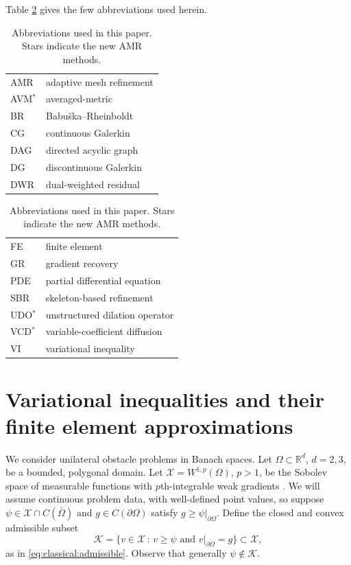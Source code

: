 \documentclass[]{interact}
\theoremstyle{plain}%
\theoremstyle{definition}
\theoremstyle{remark}
\newcommand{\RR}{\mathbb{R}}
\newcommand{\cK}{\mathcal{K}}
\newcommand{\cX}{\mathcal{X}}
\begin{document}
Table \ref{tab:abbrev} gives the few abbreviations used herein.

\begin{table}[ht]
\centering
\begin{minipage}[t]{0.45\textwidth}
\vspace{0pt}
{\small
\begin{tabular}{ll} \\
AMR       & adaptive mesh refinement \\
AVM$^*$   & averaged-metric \\
BR        & Babu\v{s}ka--Rheinboldt \\
CG        & continuous Galerkin \\
DAG       & directed acyclic graph \\
DG        & discontinuous Galerkin \\
DWR       & dual-weighted residual
\end{tabular}
}
\end{minipage}
\quad
\begin{minipage}[t]{0.45\textwidth}
\vspace{0pt}
{\small
\begin{tabular}{ll} \\
FE        & finite element \\
GR        & gradient recovery \\
PDE       & partial differential equation \\
SBR       & skeleton-based refinement \\
UDO$^*$   & unstructured dilation operator \\
VCD$^*$   & variable-coefficient diffusion \\
VI        & variational inequality
\end{tabular}
}
\end{minipage}
\caption{Abbreviations used in this paper.  Stars indicate the new AMR methods.}
\label{tab:abbrev}
\end{table}


\section{Variational inequalities and their finite element approximations} \label{sec:vifem}

We consider unilateral obstacle problems in Banach spaces.  Let $\Omega \subset \RR^d$, $d=2,3$, be a bounded, polygonal domain.  Let $\cX = W^{1,p}(\Omega)$, $p>1$, be the Sobolev space of measurable functions with $p$th-integrable weak gradients \cite{Evans2010}.  We will assume continuous problem data, with well-defined point values, so suppose $\psi \in \cX \cap C(\bar\Omega)$ and $g\in C(\partial \Omega)$ satisfy $g \ge \psi|_{\partial\Omega}$.  Define the closed and convex admissible subset
\begin{equation} \label{eq:admissible}
\cK = \{v \in \cX \,:\, v \ge \psi \text{ and } v|_{\partial \Omega} = g\} \subset \cX,
\end{equation}
as in \eqref{eq:classical:admissible}.  Observe that generally $\psi\notin\cK$.
\end{document}
